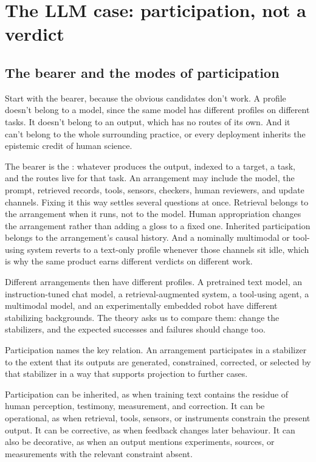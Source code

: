 \documentclass[12pt]{article}
\begin{document}
\section{The LLM case: participation, not a verdict}\label{sec:llm}

\subsection{The bearer and the modes of participation}

Start with the bearer, because the obvious candidates don't work. A profile doesn't belong
to a model, since the same model has different profiles on different tasks. It doesn't
belong to an output, which has no routes of its own. And it can't belong to the whole
surrounding practice, or every deployment inherits the epistemic credit of human science.

The bearer is the : whatever produces the output, indexed to a target, a
task, and the routes live for that task. An arrangement may include the model,
the prompt, retrieved records, tools, sensors, checkers, human reviewers, and update
channels. Fixing it this way settles several questions at once. Retrieval belongs to the
arrangement when it runs, not to the model. Human appropriation changes the arrangement
rather than adding a gloss to a fixed one. Inherited participation belongs to the
arrangement's causal history. And a nominally multimodal or tool-using system reverts to a
text-only profile whenever those channels sit idle, which is why the same product earns
different verdicts on different work.

Different arrangements then have different profiles. A pretrained text model, an
instruction-tuned chat model, a retrieval-augmented system, a tool-using agent, a
multimodal model, and an experimentally embedded robot have different stabilizing
backgrounds. The theory asks us to compare them: change the stabilizers, and the
expected successes and failures should change too.

Participation names the key relation. An arrangement participates in a stabilizer to the
extent that its outputs are generated, constrained, corrected, or selected by that
stabilizer in a way that supports projection to further cases.

Participation can be inherited, as when training text contains the residue of human
perception, testimony, measurement, and correction. It can be operational, as when
retrieval, tools, sensors, or instruments constrain the present output. It can be
corrective, as when feedback changes later behaviour. It can also be decorative,
as when an output mentions experiments, sources, or measurements with the relevant
constraint absent.
\end{document}
